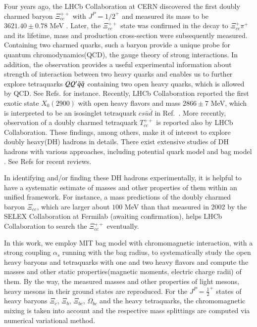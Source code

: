 \documentclass[12pt,prd,onecolumn,floatfix,nofootinbib]{revtex4}
\begin{document}
Four years ago, the LHCb Collaboration at CERN discovered the first doubly
charmed baryon $\Xi _{cc}^{++}$ with $J^{P}={1/2}^{+}$ and measured its mass
to be $3621.40\pm 0.78$ MeV \cite{Aaij:2017ueg}. Later, the $\Xi _{cc}^{++}$
state was confirmed in the decay to $\Xi _{cc}^{+}\pi ^{+}$\cite{LhcXi:prl18}
and its lifetime, mass and production cross-section were subsequently
measured\cite{LhcXiLf:prl18,LhcXcc:cp20}. Containing two charmed quarks,
such a baryon provide a unique probe for quantum chromodynamics(QCD), the
gauge theory of strong interactions. In addition, the observation provides a
useful experimental information about strength of interaction between two
heavy quarks and enables us to further explore tetraquarks $QQ^{\prime }\bar{%
q}\bar{q}$ containing two open heavy quarks, which is allowed by QCD. See
Refs. \cite{Karliner:2017qjm,Eichten:2017ffp,Luo:2017eub} for instance.
Recently, LHCb Collaboration reported the first exotic state $X_{0}(2900)$
with open heavy flavors and mass $2866\pm 7$ MeV\cite{LHCb:2020kd}, which is
interpreted to be an isosinglet tetraquark $cs\bar{u}\bar{d}$ in Ref.~\cite%
{Karliner:2020vsi}. More recently, observation of a doubly charmed
tetraquark $T_{cc}^{++}$ is reported also by LHCb Collaboration\cite%
{TccPoly:2021}. These findings, among others, make it of interest to explore
doubly heavy(DH) hadrons in details. There exist extensive studies of DH
hadrons with various approaches, including potential quark model and bag
model \cite%
{Fleck:1989mb,Ebert:2004ck,Roberts:2007ni,Albertus:2006ya,Aliev:2012iv,Giannuzzi:2009gh,Bernotas:2008fv,Bernotas:2012nz,He:2004px,KR:2014gca,Liu:2018euh}%
. See Refs \cite{Ali:2017jda,Liu:2019zoy} for recent reviews.

In identifying and/or finding these DH hadrons experimentally, it is helpful
to have a systematic estimate of masses and other properties of them within
an unified framework. For instance, a mass predictions \cite%
{Ebert:2004ck,KR:2014gca} of the doubly charmed baryon $\Xi _{cc}$, which
are larger about $100$ MeV than that measured in 2002 by the SELEX
Collaboration at Fermilab \cite{Moinester:2002uw}(awaiting confirmation),
helps LHCb Collaboration to search the $\Xi _{cc}^{++}$\cite{Aaij:2017ueg}
eventually.

In this work, we employ MIT bag model with chromomagnetic interaction, with
a strong coupling $\alpha _{s}$ running with the bag radius, to
systematically study the open heavy baryons and tetraquarks with one and two
heavy flavors and compute the masses and other static properties(magnetic
moments, electric charge radii) of them. By the way, the measured masses and
other properties of light mesons, heavy mesons in their ground states are
reproduced. For the $J^{P}={\frac{1}{2}}^{+}$ states of heavy baryons $\Xi
_{c}$, $\Xi _{b}$, $\Xi _{bc}$, $\Omega _{bc}$ and the heavy tetraquarks,
the chromomagnetic mixing is taken into account and the respective mass
splittings are computed via numerical variational method.
\end{document}
